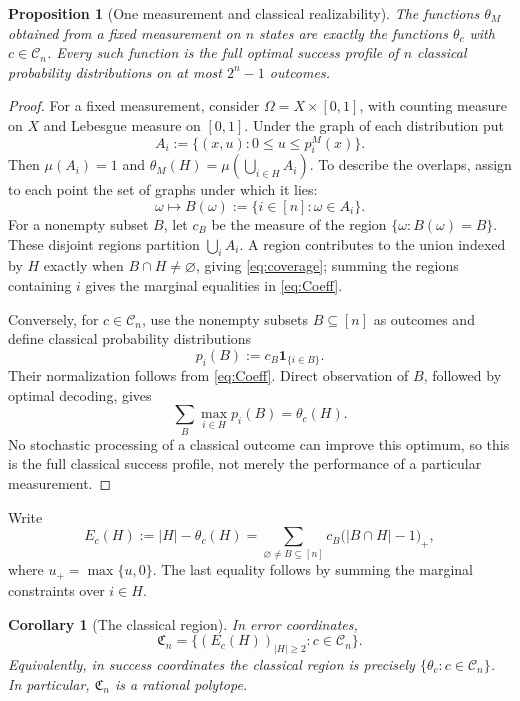 \documentclass[10pt,a4paper]{amsart}
\newtheorem{proposition}[theorem]{Proposition}
\newtheorem{corollary}[theorem]{Corollary}
\newcommand{\1}{\mathbf 1}
\newcommand{\Coeff}{\mathcal C}
\newcommand{\Creg}{\mathfrak C}
\begin{document}
\begin{proposition}[One measurement and classical realizability]
\label{prop:one-measurement}
The functions $\theta_M$ obtained from a fixed measurement on $n$ states are
exactly the functions $\theta_c$ with $c\in\Coeff_n$. Every such function is
the \emph{full optimal success profile} of $n$ classical probability
distributions on at most $2^n-1$ outcomes.
\end{proposition}
\begin{proof}
For a fixed measurement, consider $\Omega=X\times[0,1]$, with counting measure
on $X$ and Lebesgue measure on $[0,1]$. Under the graph of each distribution put
\[
 A_i:=\{(x,u):0\le u\le p_i^M(x)\}.
\]
Then $\mu(A_i)=1$ and
$\theta_M(H)=\mu(\bigcup_{i\in H}A_i)$.
To describe the overlaps, assign to each point the set of graphs under which
it lies:
\[
 \omega\longmapsto B(\omega):=\{i\in[n]:\omega\in A_i\}.
\]
For a nonempty subset $B$, let $c_B$ be the measure of the region
$\{\omega:B(\omega)=B\}$. These disjoint regions partition
$\bigcup_i A_i$. A region contributes to the union indexed by $H$ exactly when
$B\cap H\ne\varnothing$, giving \eqref{eq:coverage}; summing the regions
containing $i$ gives the marginal equalities in \eqref{eq:Coeff}.

Conversely, for $c\in\Coeff_n$, use the nonempty subsets $B\subseteq[n]$ as
outcomes and define classical probability distributions
\begin{equation}\label{eq:classical-distributions}
 p_i(B):=c_B\1_{\{i\in B\}}.
\end{equation}
Their normalization follows from \eqref{eq:Coeff}. Direct observation of $B$,
followed by optimal decoding, gives
\[
 \sum_B\max_{i\in H}p_i(B)=\theta_c(H).
\]
No stochastic processing of a classical outcome can improve this optimum, so
this is the full classical success profile, not merely the performance of a
particular measurement.
\end{proof}

Write
\begin{equation}\label{eq:E-c}
 E_c(H):=|H|-\theta_c(H)
       =\sum_{\varnothing\ne B\subseteq[n]}c_B\bigl(|B\cap H|-1\bigr)_+,
\end{equation}
where $u_+=\max\{u,0\}$. The last equality follows by summing the marginal
constraints over $i\in H$.

\begin{corollary}[The classical region]\label{cor:classical-region}
In error coordinates,
\begin{equation}\label{eq:Creg}
 \Creg_n=\{(E_c(H))_{|H|\ge2}:c\in\Coeff_n\}.
\end{equation}
Equivalently, in success coordinates the classical region is precisely
$\{\theta_c:c\in\Coeff_n\}$. In particular, $\Creg_n$ is a rational polytope.
\end{corollary}
\end{document}
